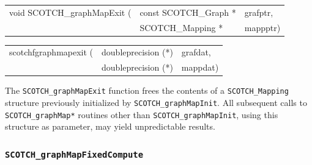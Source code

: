 \begin{itemize}
\progsyn

{\tt\begin{tabular}{l@{}ll}
void SCOTCH\_graphMapExit ( & const SCOTCH\_Graph * & grafptr, \\
                            & SCOTCH\_Mapping *     & mappptr)
\end{tabular}}

{\tt\begin{tabular}{l@{}ll}
scotchfgraphmapexit ( & doubleprecision (*) & grafdat, \\
                      & doubleprecision (*) & mappdat)
\end{tabular}}

\progdes

The {\tt SCOTCH\_graphMapExit} function frees the contents of a
{\tt SCOTCH\_\lbt Mapping} structure previously initialized by
{\tt SCOTCH\_\lbt graph\lbt Map\lbt Init}. All subsequent calls to
{\tt SCOTCH\_\lbt graph\lbt Map*} routines other than
{\tt SCOTCH\_\lbt graph\lbt Map\lbt Init}, using this structure
as parameter, may yield unpredictable results.
\end{itemize}

\subsubsection{{\tt SCOTCH\_graphMapFixedCompute}}


